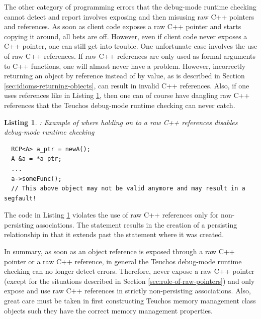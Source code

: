 \documentclass[pdf,ps2pdf,11pt]{SANDreport}
\newtheorem{listing}{Listing}
\begin{document}

The other category of programming errors that the debug-mode runtime
checking cannot detect and report involves exposing and then misusing
raw C++ pointers and references.  As soon as client code exposes a raw
C++ pointer and starts copying it around, all bets are off.  However,
even if client code never exposes a C++ pointer, one can still get
into trouble.  One unfortunate case involves the use of raw C++
references.  If raw C++ references are only used as formal arguments
to C++ functions, one will almost never have a problem.  However,
incorrectly returning an {} object by reference instead of by
value, as is described in Section
{}\ref{sec:idioms-returning-objects}, can result in invalid C++
references.  Also, if one uses references like in Listing
{}\ref{listing:raw-ref-dangling-ref}, then one can of course have
dangling raw C++ references that the Teuchos debug-mode runtime
checking can never catch.

{}\begin{listing}: Example of where holding on to a raw C++ references
disables debug-mode runtime checking
\label{listing:raw-ref-dangling-ref}
{\small\begin{verbatim}
  RCP<A> a_ptr = newA();
  A &a = *a_ptr;
  ...
  a->someFunc();
  // This above object may not be valid anymore and may result in a segfault!
\end{verbatim}}
\end{listing}

The code in Listing {}\ref{listing:raw-ref-dangling-ref} violates the
use of raw C++ references only for non-persisting associations.  The
statement {} results in the creation of a
persisting relationship in that it extends past the statement where it
was created.

In summary, as soon as an object reference is exposed through a raw
C++ pointer or a raw C++ reference, in general the Teuchos debug-mode
runtime checking can no longer detect errors.  Therefore, never expose
a raw C++ pointer (except for the situations described in Section
{}\ref{sec:role-of-raw-pointers}) and only expose and use raw C++
references in strictly non-persisting associations.  Also, great care
must be taken in first constructing Teuchos memory management class
objects such they have the correct memory management properties.
\end{document}
